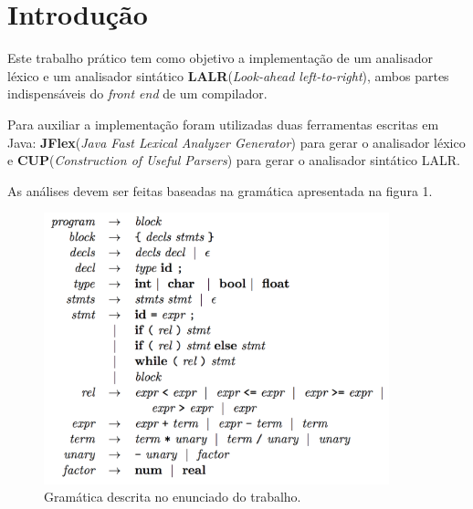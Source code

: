 \section{Introdução}

Este trabalho prático tem como objetivo a implementação de um analisador léxico e um analisador sintático \textbf{LALR}(\textit{Look-ahead left-to-right}), ambos partes indispensáveis do \textit{front end} de um compilador. 

Para auxiliar a implementação foram utilizadas duas ferramentas escritas em Java: \textbf{JFlex}(\textit{Java Fast Lexical Analyzer Generator}) para gerar o analisador léxico e \textbf{CUP}(\textit{Construction of Useful Parsers}) para gerar o analisador sintático LALR.

As análises devem ser feitas baseadas na gramática apresentada na figura 1.

\begin{figure}[ht]	
 \centering
  \includegraphics[width=10cm,keepaspectratio]{images/grammar.png}
 \caption{Gramática descrita no enunciado do trabalho.}
\end{figure}
